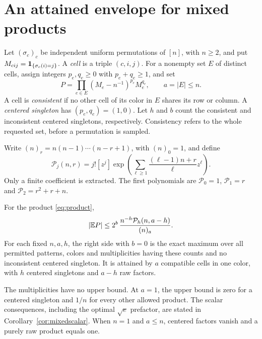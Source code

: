 \section{An attained envelope for mixed products}\label{sec:mixed}

Let $(\sigma_c)_c$ be independent uniform permutations of $[n]$, with $n\ge2$, and put $M_{cij}=\mathbf 1_{\{\sigma_c(i)=j\}}$. A \emph{cell} is a triple $(c,i,j)$. For a nonempty set $E$ of distinct cells, assign integers $p_e,q_e\ge0$ with $p_e+q_e\ge1$, and set
\begin{equation}\label{eq:product}
P=\prod_{e\in E}(M_e-n^{-1})^{p_e}M_e^{q_e},\qquad a=|E|\le n.
\end{equation}
A cell is \emph{consistent} if no other cell of its color in $E$ shares its row or column. A \emph{centered singleton} has $(p_e,q_e)=(1,0)$. Let $h$ and $b$ count the consistent and inconsistent centered singletons, respectively. Consistency refers to the whole requested set, before a permutation is sampled.

Write $(n)_r=n(n-1)\cdots(n-r+1)$, with $(n)_0=1$, and define
\begin{equation}\label{eq:depletedpoly}
\mathcal P_j(n,r)
=j![z^j]\exp\left(\sum_{\ell\ge1}
\frac{(\ell-1)n+r}{\ell}z^\ell\right).
\end{equation}
Only a finite coefficient is extracted. The first polynomials are
$\mathcal P_0=1$, $\mathcal P_1=r$ and $\mathcal P_2=r^2+r+n$.

\begin{theorem}\label{thm:mixed}
For the product \eqref{eq:product},
\begin{equation}\label{eq:mixedexact}
|\mathbb E P|\le 2^b\,\frac{n^{-h}\mathcal P_h(n,a-h)}{(n)_a}.
\end{equation}
For each fixed $n,a,h$, the right side with $b=0$ is the exact maximum over all permitted patterns, colors and multiplicities having these counts and no inconsistent centered singleton. It is attained by $a$ compatible cells in one color, with $h$ centered singletons and $a-h$ raw factors.
\end{theorem}

The multiplicities have no upper bound. At $a=1$, the upper bound is zero for a centered singleton and $1/n$ for every other allowed product. The scalar consequences, including the optimal $\sqrt e$ prefactor, are stated in Corollary~\ref{cor:mixedscalar}. When $n=1$ and $a\le n$, centered factors vanish and a purely raw product equals one.


